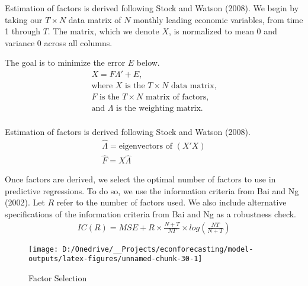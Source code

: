 \documentclass[11pt, letterpaper]{article}\usepackage[]{graphicx}\usepackage[]{color}
\begin{document}
Estimation of factors is derived following Stock and Watson (2008). We begin by taking our $T \times N$ data matrix of $N$ monthly leading economic variables, from time 1 through $T$. The matrix, which we denote $X$, is normalized to mean 0 and variance 0 across all columns.

The goal is to minimize the error $E$ below.
\begin{align*}
	X = F  \Lambda ' + E,\\
	\text{where $X$ is the $T \times N$ data matrix,}\\
	\text{$F$ is the $T \times N$ matrix of factors,}\\
	\text{and $\Lambda$ is the weighting matrix.}\\
\end{align*}

Estimation of factors is derived following Stock and Watson (2008).
\begin{align*}
	\widehat{\Lambda} = \text{eigenvectors of } (X'X)\\
	\widehat{F} = X \widehat{\Lambda}
\end{align*}



Once factors are derived, we select the optimal number of factors to use in predictive regressions. To do so, we use the information criteria from Bai and Ng (2002). Let $R$ refer to the number of factors used. We also include alternative specifications of the information criteria from Bai and Ng as a robustness check.
\begin{align*}
	IC(R) = MSE + R \times \frac{N+T}{NT} \times log\left(\frac{NT}{N+T}\right)
\end{align*}

\begin{figure}[H]

{\centering \texttt{[image: D:/Onedrive/\_\_Projects/econforecasting/model-outputs/latex-figures/unnamed-chunk-30-1]} 

}

\caption[Factor Selection]{Factor Selection}\label{fig:unnamed-chunk-30}
\end{figure}
\end{document}
